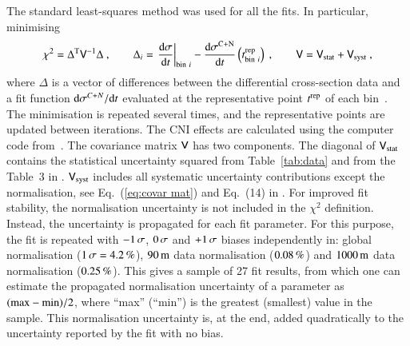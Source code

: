 The standard least-squares method was used for all the fits. In particular, minimising
\begin{equation}
\label{eq:chi sq A}
	\chi^2 = \Delta^{\rm T} \mathsf{V}^{-1} \Delta\ ,\qquad
	\Delta_i = \left.{{\rm d}\sigma\over {\rm d} t}\right|_{{\rm bin}\ i} - {{\rm d}\sigma^{\rm C+N}\over{\rm d} t}\left(t^{\rm rep}_{{\rm bin}\ i}\right)\ ,\qquad
	\mathsf{V} = \mathsf{V}_{\rm stat} + \mathsf{V}_{\rm syst}\ ,
\end{equation}
where $\Delta$ is a vector of differences between the differential cross-section data and a fit function ${\rm d}\sigma^{C+N}/{\rm d} t$ evaluated at the representative point $t^{\rm rep}$ of each bin~\cite{lafferty94}. The minimisation is repeated several times, and the representative points are updated between iterations. The CNI effects are calculated using the computer code from~\cite{elegent}. The covariance matrix $\mathsf{V}$ has two components. The diagonal of $\mathsf{V}_{\rm stat}$ contains the statistical uncertainty squared from Table~\ref{tab:data} and from the Table~3 in \cite{8tev-90m}. $\mathsf{V}_{\rm syst}$ includes all systematic uncertainty contributions except the normalisation, see Eq.~(\ref{eq:covar mat}) and Eq.~(14) in \cite{8tev-90m}. For improved fit stability, the normalisation uncertainty is not included in the $\chi^2$ definition. Instead, the uncertainty is propagated for each fit parameter. For this purpose, the fit is repeated with $-1\,{\rm \sigma}$, $0\,{\rm \sigma}$ and $+1\,{\rm \sigma}$ biases independently in: global normalisation ($1\,{\rm \sigma} = 4.2\,{\rm \%}$), $90\,{\rm m}$ data normalisation ($0.08\,{\rm \%}$) and $1000\,{\rm m}$ data normalisation ($0.25\,{\rm \%}$). This gives a sample of 27 fit results, from which one can estimate the propagated normalisation uncertainty of a parameter as $(\hbox{max} - \hbox{min})/2$, where ``max'' (``min'') is the greatest (smallest) value in the sample. This normalisation uncertainty is, at the end, added quadratically to the uncertainty reported by the fit with no bias.


